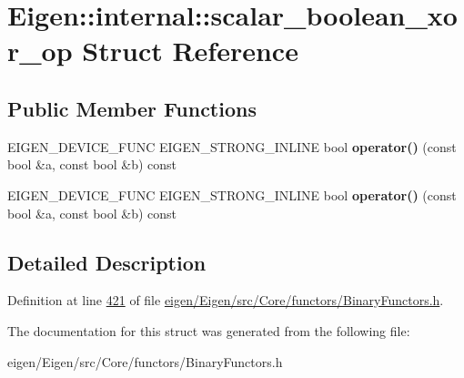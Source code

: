 \hypertarget{struct_eigen_1_1internal_1_1scalar__boolean__xor__op}{}\section{Eigen\+:\+:internal\+:\+:scalar\+\_\+boolean\+\_\+xor\+\_\+op Struct Reference}
\label{struct_eigen_1_1internal_1_1scalar__boolean__xor__op}
\subsection*{Public Member Functions}
\begin{DoxyCompactItemize}
\item 
\mbox{\label{struct_eigen_1_1internal_1_1scalar__boolean__xor__op_a42494aeee806e9196460f5e1608c6678}} 
E\+I\+G\+E\+N\+\_\+\+D\+E\+V\+I\+C\+E\+\_\+\+F\+U\+NC E\+I\+G\+E\+N\+\_\+\+S\+T\+R\+O\+N\+G\+\_\+\+I\+N\+L\+I\+NE bool {\bfseries operator()} (const bool \&a, const bool \&b) const
\item 
\mbox{\label{struct_eigen_1_1internal_1_1scalar__boolean__xor__op_a42494aeee806e9196460f5e1608c6678}} 
E\+I\+G\+E\+N\+\_\+\+D\+E\+V\+I\+C\+E\+\_\+\+F\+U\+NC E\+I\+G\+E\+N\+\_\+\+S\+T\+R\+O\+N\+G\+\_\+\+I\+N\+L\+I\+NE bool {\bfseries operator()} (const bool \&a, const bool \&b) const
\end{DoxyCompactItemize}


\subsection{Detailed Description}


Definition at line \hyperlink{eigen_2_eigen_2src_2_core_2functors_2_binary_functors_8h_source_l00421}{421} of file \hyperlink{eigen_2_eigen_2src_2_core_2functors_2_binary_functors_8h_source}{eigen/\+Eigen/src/\+Core/functors/\+Binary\+Functors.\+h}.



The documentation for this struct was generated from the following file\+:\begin{DoxyCompactItemize}
\item 
eigen/\+Eigen/src/\+Core/functors/\+Binary\+Functors.\+h\end{DoxyCompactItemize}
